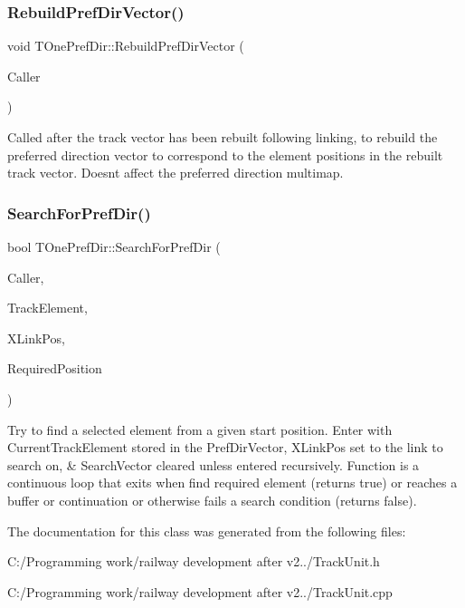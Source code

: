 \subsubsection{\texorpdfstring{Rebuild\+Pref\+Dir\+Vector()}{RebuildPrefDirVector()}}
{\footnotesize\ttfamily void T\+One\+Pref\+Dir\+::\+Rebuild\+Pref\+Dir\+Vector (\begin{DoxyParamCaption}\item[{int}]{Caller }\end{DoxyParamCaption})}

Called after the track vector has been rebuilt following linking, to rebuild the preferred direction vector to correspond to the element positions in the rebuilt track vector. Doesn\textquotesingle{}t affect the preferred direction multimap. \mbox{\label{class_t_one_pref_dir_a82c6a19d67ada7059491afae05ced4a4}} 
\subsubsection{\texorpdfstring{Search\+For\+Pref\+Dir()}{SearchForPrefDir()}}
{\footnotesize\ttfamily bool T\+One\+Pref\+Dir\+::\+Search\+For\+Pref\+Dir (\begin{DoxyParamCaption}\item[{int}]{Caller,  }\item[{\mbox{\hyperlink{class_t_track_element}{T\+Track\+Element}}}]{Track\+Element,  }\item[{int}]{X\+Link\+Pos,  }\item[{int}]{Required\+Position }\end{DoxyParamCaption})\hspace{0.3cm}{\ttfamily [protected]}}

Try to find a selected element from a given start position. Enter with Current\+Track\+Element stored in the Pref\+Dir\+Vector, X\+Link\+Pos set to the link to search on, \& Search\+Vector cleared unless entered recursively. Function is a continuous loop that exits when find required element (returns true) or reaches a buffer or continuation or otherwise fails a search condition (returns false). 

The documentation for this class was generated from the following files\+:\begin{DoxyCompactItemize}
\item 
C\+:/\+Programming work/railway development after v2../Track\+Unit.\+h\item 
C\+:/\+Programming work/railway development after v2../Track\+Unit.\+cpp\end{DoxyCompactItemize}

